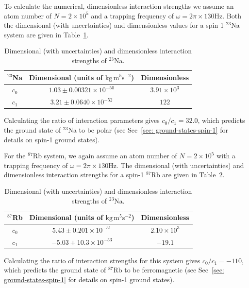 To calculate the numerical, dimensionless interaction strengths we assume an
atom number of \(N = 2\times10^5\) and a trapping frequency of
\(\omega = 2\pi \times 130\)Hz.
Both the dimensional (with uncertainties) and dimensionless values for a spin-1
\( ^{23}\)Na system are given in Table~\ref{table: spin-1-interactions-sodium}.
\begin{table}[!htbp]
    \centering
    \begin{tabular}{ccc}
        \toprule
        \( ^{23}\)Na & Dimensional (units of \(\text{kg}\, \text{m}^5
        \text{s}^{-2}\)) & Dimensionless \\
        \midrule
        \(c_0\) & \(1.03 \pm 0.00321 \times 10^{-50}\) & \(3.91\times10^3\) \\
        \(c_1\) & \(3.21 \pm 0.0640 \times 10^{-52}\) & \(122\) \\
        \bottomrule
    \end{tabular}
    \caption{\label{table: spin-1-interactions-sodium}Dimensional (with
    uncertainties) and dimensionless interaction strengths of \( ^{23}\)Na.}
\end{table}
Calculating the ratio of interaction parameters gives \(c_0/c_1=32.0 \),
which predicts the ground state of \( ^{23}\)Na to be polar (see
Sec~\ref{sec: ground-states-spin-1} for details on spin-1 ground states).

For the \( ^{87}\)Rb system, we again assume an atom number of
\(N = 2\times 10^5\) with a trapping frequency of
\(\omega = 2\pi \times 130\)Hz.
The dimensional (with uncertainties) and dimensionless interaction strengths
for a spin-1 \( ^{87}\)Rb are given in
Table~\ref{table: spin-1-interactions-rb87}.
\begin{table}[!htbp]
    \centering
    \begin{tabular}{ccc}
        \toprule
        \( ^{87}\)Rb & Dimensional (units of \(\text{kg}\, \text{m}^5
        \text{s}^{-2}\)) & Dimensionless \\
        \midrule
        \(c_0\) & \(5.43 \pm 0.201 \times 10^{-51}\) & \(2.10\times10^3\) \\
        \(c_1\) & \(-5.03 \pm 10.3 \times 10^{-53}\) & \(-19.1\) \\
        \bottomrule
    \end{tabular}
    \caption{\label{table: spin-1-interactions-rb87}Dimensional (with
    uncertainties) and dimensionless interaction strengths of \( ^{23}\)Na.}
\end{table}
Calculating the ratio of interaction strengths for this system gives
\(c_0/c_1=-110 \), which predicts the ground state of \( ^{87}\)Rb to be
ferromagnetic (see
Sec~\ref{sec: ground-states-spin-1} for details on spin-1 ground states).

